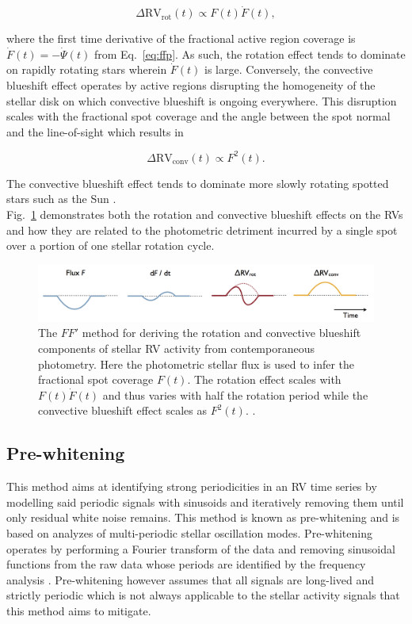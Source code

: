 \begin{equation}
  \Delta \text{RV}_{\text{rot}}(t) \propto F(t) \dot{F}(t),
\end{equation}

\noindent where the first time derivative of the fractional active region coverage is
$\dot{F}(t) = -\dot{\Psi}(t)$ from Eq.~\ref{eq:ffp}. As such, the rotation effect tends to dominate
on rapidly rotating stars wherein $\dot{F}(t)$ is large. Conversely, the convective blueshift effect
operates by active regions disrupting the homogeneity of the stellar disk on which convective
blueshift is ongoing everywhere. This disruption scales with the fractional spot coverage and
the angle between the spot normal and the line-of-sight which results in

\begin{equation}
  \Delta \text{RV}_{\text{conv}}(t) \propto F^2(t).
\end{equation}

\noindent The convective blueshift effect tends to dominate more slowly rotating spotted
stars such as the Sun \citep{haywood16}. \\

Fig.~\ref{fig:ffp} demonstrates both the rotation and
convective blueshift effects on the RVs and how they are related to the photometric detriment
incurred by a single spot over a portion of one stellar rotation cycle.

\begin{figure}
  \centering
  \includegraphics[width=0.8\hsize]{figures/ffp.png}
  \caption[Illustration of the $FF'$ method.]
      {The $FF'$ method for deriving the rotation and convective blueshift components
    of stellar RV activity from contemporaneous photometry. Here the photometric stellar flux
    is used to infer the fractional spot coverage $F(t)$. The rotation effect scales with
    $F(t) \dot{F}(t)$ and thus varies with half the rotation period while the convective blueshift
    effect scales as $F^2(t)$. \citep[Image credit:][]{haywood15}.}
  \label{fig:ffp}
\end{figure}


\subsection{Pre-whitening}
This method aims at identifying strong periodicities in an RV time series by modelling
said periodic signals with sinusoids and iteratively removing them
until only residual white noise remains. This method is known as pre-whitening and
is based on analyzes of multi-periodic stellar oscillation modes. Pre-whitening operates
by performing a Fourier
transform of the data and removing sinusoidal functions from the raw data whose periods are
identified by the frequency analysis \citep{queloz09}. Pre-whitening however assumes that all
signals are long-lived and strictly periodic which is not always applicable to the stellar activity
signals that this method aims to mitigate.

